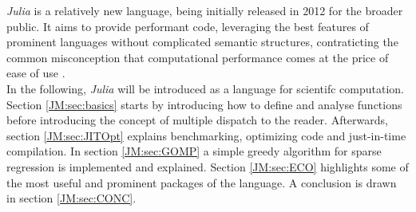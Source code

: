 \textit{Julia} \cite{JMBezansonEtAl2015} is a relatively new language, being initially released in 2012 for the broader public. It aims to provide performant code, leveraging the best features of 
prominent languages without complicated semantic structures, contraticting the common misconception that computational performance comes at the price of ease of use \cite{JMEdelman2019}. \\

In the following, \textit{Julia} will be introduced as a language for scientifc computation. Section \ref{JM:sec:basics} starts by introducing how to define and analyse functions before introducing the concept of multiple dispatch to the reader.
Afterwards, section \ref{JM:sec:JITOpt} explains benchmarking, optimizing code and just-in-time compilation. In section \ref{JM:sec:GOMP} a simple greedy algorithm for sparse regression is implemented and explained. Section \ref{JM:sec:ECO} highlights some of the most useful and prominent packages of the language.
A conclusion is drawn in section \ref{JM:sec:CONC}.

\newpage


%
